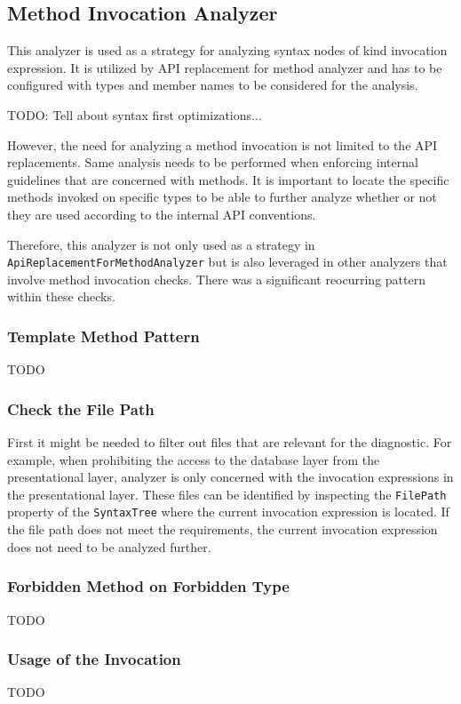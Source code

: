 \documentclass[
  digital, %
  table,   %
  lof,     %
  lot,     %
  oneside,
]{fithesis3}
\begin{document}
\subsection{Method Invocation Analyzer}
This analyzer is used as a strategy for analyzing syntax nodes of kind invocation expression. It is utilized by API replacement for method analyzer and has to be configured with types and member names to be considered for the analysis. 

TODO: Tell about syntax first optimizations...

However, the need for analyzing a method invocation is not limited to the API replacements. Same analysis needs to be performed when enforcing internal guidelines that are concerned with methods. It is important to locate the specific methods invoked on specific types to be able to further analyze whether or not they are used according to the internal API conventions. 


Therefore, this analyzer is not only used as a strategy in \texttt{ApiReplacementForMethodAnalyzer} but is also leveraged in other analyzers that involve method invocation checks. There was a significant reocurring pattern within these checks. 

\subsubsection{Template Method Pattern}
TODO
\subsubsection{Check the File Path}
First it might be needed to filter out files that are relevant for the diagnostic. For example, when prohibiting the access to the database layer from the presentational layer, analyzer is only concerned with the invocation expressions in the presentational layer. These files can be identified by inspecting the \texttt{FilePath} property of the \texttt{SyntaxTree} where the current invocation expression is located. If the file path does not meet the requirements, the current invocation expression does not need to be analyzed further.


\subsubsection{Forbidden Method on Forbidden Type}
TODO 

\subsubsection{Usage of the Invocation}
TODO
\end{document}
